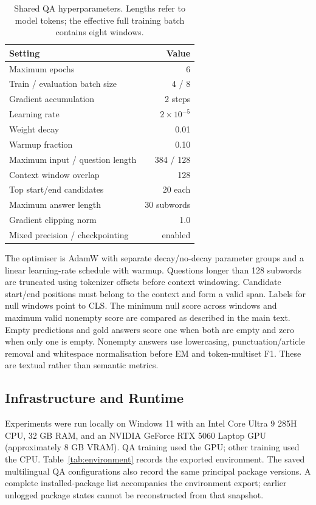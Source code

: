 \documentclass[11pt]{article}
\begin{document}
\begin{table}[ht]
\centering\small
\begin{tabular}{lr}
\toprule
Setting & Value\\
\midrule
Maximum epochs & 6\\
Train / evaluation batch size & 4 / 8\\
Gradient accumulation & 2 steps\\
Learning rate & $2\times10^{-5}$\\
Weight decay & 0.01\\
Warmup fraction & 0.10\\
Maximum input / question length & 384 / 128\\
Context window overlap & 128\\
Top start/end candidates & 20 each\\
Maximum answer length & 30 subwords\\
Gradient clipping norm & 1.0\\
Mixed precision / checkpointing & enabled\\
\bottomrule
\end{tabular}
\caption{Shared QA hyperparameters. Lengths refer to model tokens; the effective full training batch contains eight windows.}
\label{tab:qa-settings}
\end{table}

The optimiser is AdamW with separate decay/no-decay parameter groups and a linear learning-rate schedule with warmup. Questions longer than 128 subwords are truncated using tokenizer offsets before context windowing. Candidate start/end positions must belong to the context and form a valid span. Labels for null windows point to CLS. The minimum null score across windows and maximum valid nonempty score are compared as described in the main text. Empty predictions and gold answers score one when both are empty and zero when only one is empty. Nonempty answers use lowercasing, punctuation/article removal and whitespace normalisation before EM and token-multiset F1. These are textual rather than semantic metrics.

\subsection{Infrastructure and Runtime}
Experiments were run locally on Windows 11 with an Intel Core Ultra 9 285H CPU, 32 GB RAM, and an NVIDIA GeForce RTX 5060 Laptop GPU (approximately 8 GB VRAM). QA training used the GPU; other training used the CPU. Table~\ref{tab:environment} records the exported environment. The saved multilingual QA configurations also record the same principal package versions. A complete installed-package list accompanies the environment export; earlier unlogged package states cannot be reconstructed from that snapshot.
\end{document}
